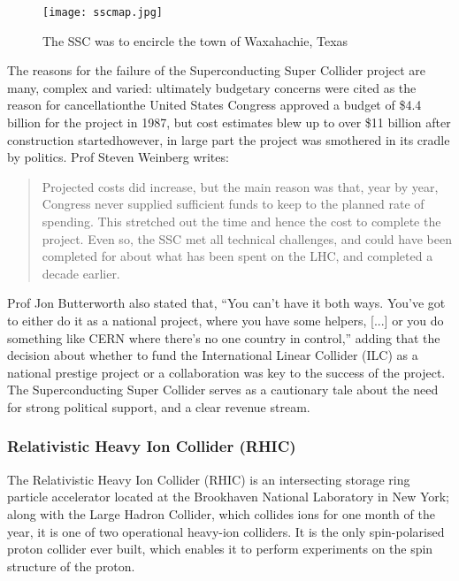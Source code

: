 \begin{figure}
\centering
\texttt{[image: sscmap.jpg]}
\caption{The SSC was to encircle the town of Waxahachie, Texas\cite{SSC:SI:Online}}
\end{figure}

The reasons for the failure of the Superconducting Super Collider project are many, complex and varied: ultimately budgetary concerns were cited as the reason for cancellation\textemdash the United States Congress approved a budget of \$4.4 billion\cite{SSC:BE} for the project in 1987, but cost estimates blew up to over \$11 billion\cite{SSC:LAT:Online} after construction started\textemdash however, in large part the project was smothered in its cradle by politics. Prof Steven Weinberg writes:

\begin{quote}
Projected costs did increase, but the main reason was that, year by year, Congress never supplied sufficient funds to keep to the planned rate of spending. This stretched out the time and hence the cost to complete the project. Even so, the SSC met all technical challenges, and could have been completed for about what has been spent on the LHC, and completed a decade earlier.\cite{SSC:Weinberg:Online}
\end{quote}

Prof Jon Butterworth also stated that, ``You can't have it both ways. You’ve got to either do it as a national project, where you have some helpers, [...] or you do something like CERN where there's no one country in control,'' adding that the decision about whether to fund the International Linear Collider (ILC) as a national prestige project or a collaboration was key to the success of the project\cite{Butterworth:Interview}. The Superconducting Super Collider serves as a cautionary tale about the need for strong political support, and a clear revenue stream.

\subsubsection{Relativistic Heavy Ion Collider (RHIC)}
The Relativistic Heavy Ion Collider (RHIC) is an intersecting storage ring particle accelerator located at the Brookhaven National Laboratory in New York; along with the Large Hadron Collider, which collides ions for one month of the year, it is one of two operational heavy-ion colliders. It is the only spin-polarised proton collider ever built\cite{RHIC:Spin}, which enables it to perform experiments on the spin structure of the proton.


